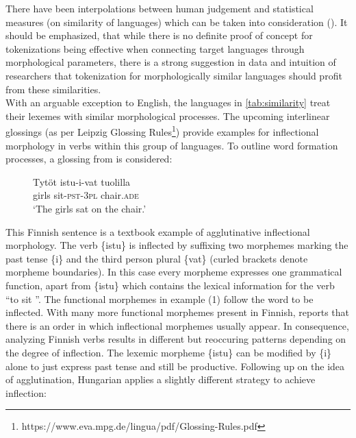 There have been interpolations between human judgement and statistical measures (on similarity of languages) which can be taken into consideration (\cite{bentz-etal-2016-comparison}).
It should be emphasized, that while there is no definite proof of concept for tokenizations being effective when connecting target languages through morphological parameters, there is a strong suggestion in data and intuition of researchers that tokenization for morphologically similar languages should profit from these similarities.
\\

With an arguable exception to English, the languages in \autoref{tab:similarity} treat their lexemes with similar morphological processes.
The upcoming interlinear glossings (as per Leipzig Glossing Rules\footnote{https://www.eva.mpg.de/lingua/pdf/Glossing-Rules.pdf}) provide examples for inflectional morphology in verbs within this group of languages.
To outline word formation processes, a glossing from \textcite[71]{finverbs} is considered:

\begin{figure}[h]
\centering
    \label{fig:fin}
    \begin{exe}
        \ex
        \gll  Tytöt istu-i-vat tuolilla \\
            girls sit-\textsc{pst}-3\textsc{pl} chair.\textsc{ade}\\
        \glt  `The girls sat on the chair.'
    \end{exe}
\end{figure}

This Finnish sentence is a textbook example of agglutinative inflectional morphology.
The verb \{istu\} is inflected by suffixing two morphemes marking the past tense \{i\} and the third person plural \{vat\} (curled brackets denote morpheme boundaries).
In this case every morpheme expresses one grammatical function, apart from \{istu\} which contains the lexical information for the verb \textquotedblleft to sit \textquotedblright.
The functional morphemes in example (1) follow the word to be inflected.
With many more functional morphemes present in Finnish, \citeauthor{finverbs} reports that there is an order in which inflectional morphemes usually appear.
In consequence, analyzing Finnish verbs results in different but reoccuring patterns depending on the degree of inflection.
The lexemic morpheme \{istu\} can be modified by \{i\} alone to just express past tense and still be productive.
Following up on the idea of agglutination, Hungarian applies a slightly different strategy to achieve inflection:

